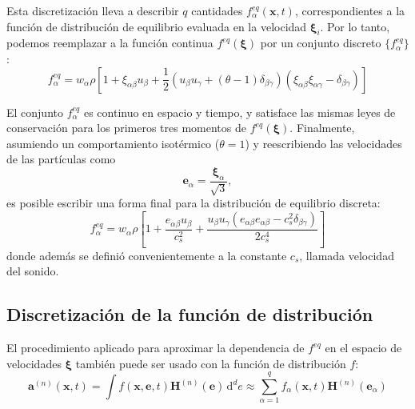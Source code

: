 Esta discretizaci\'on lleva a describir $q$ cantidades $f_{\alpha}^{eq}(\bm{x},t)$, correspondientes a la funci\'on de distribuci\'on de equilibrio evaluada en la velocidad $\bm{\xi}_i$. Por lo tanto, podemos reemplazar a la funci\'on continua $f^{eq}(\bm{\xi})$ por un conjunto discreto $\{ f_{\alpha}^{eq} \}$:
\begin{equation}
	f_{\alpha}^{eq} = w_{\alpha} \rho \left[ 1 + \xi_{{\alpha}\beta}u_{\beta} + \dfrac{1}{2}\left( u_{\beta}u_{\gamma}+(\theta-1)\delta_{\beta\gamma} \right)\left(\xi_{{\alpha}\beta}\xi_{{\alpha}\gamma} - \delta_{\beta\gamma}\right) \right]
\end{equation}
\par
El conjunto ${f_{\alpha}^{eq}}$ es continuo en espacio y tiempo, y satisface las mismas leyes de conservaci\'on para los primeros tres momentos de $f^{eq}(\bm{\xi})$. Finalmente, asumiendo un comportamiento isot\'ermico ($\theta = 1$) y reescribiendo las velocidades de las part\'iculas como
\begin{equation}
	\bm{e}_{\alpha} = \dfrac{\bm{\xi}_{\alpha}}{\sqrt{3}},
\end{equation}
es posible escribir una forma final para la distribuci\'on de equilibrio discreta:
\begin{equation}
	f_{\alpha}^{eq} = w_{\alpha} \rho \left[ 1 + \dfrac{e_{\alpha \beta}u_{\beta}}{c_s^2} + \dfrac{u_{\beta}u_{\gamma}(e_{\alpha \beta}e_{{\alpha}\beta}-c_s^2\delta_{\beta\gamma})}{2c_s^4} \right]
	\label{eq:feq}
\end{equation}
donde adem\'as se defini\'o convenientemente a la constante $c_s$, llamada velocidad del sonido.


\subsection{Discretizaci\'on de la funci\'on de distribuci\'on}
El procedimiento aplicado para aproximar la dependencia de $f^{eq}$ en el espacio de velocidades $\bm{\xi}$ tambi\'en puede ser usado con la funci\'on de distribuci\'on $f$:
\begin{equation}
	\bm{a}^{(n)}(\bm{x},t) = \int f(\bm{x}, \bm{e}, t) \bm{H}^{(n)}(\bm{e}) \, \mbox{d}^d e \approx \sum_{{\alpha}=1}^q f_{\alpha}(\bm{x},t)\bm{H}^{(n)}(\bm{e}_{\alpha})
\end{equation}

